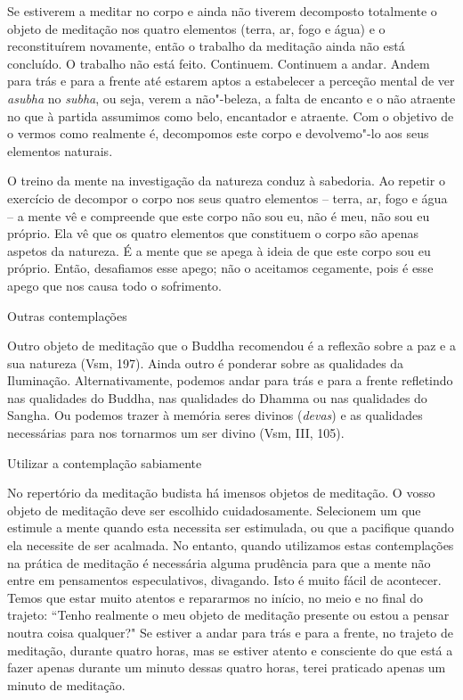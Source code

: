 Se estiverem a meditar no corpo e ainda não tiverem decomposto
totalmente o objeto de meditação nos quatro elementos (terra, ar, fogo e
água) e o reconstituírem novamente, então o trabalho da meditação ainda
não está concluído. O trabalho não está feito. Continuem. Continuem a
andar. Andem para trás e para a frente até estarem aptos a estabelecer a
perceção mental de ver \emph{asubha} no \emph{subha}, ou seja, verem a
não"-beleza, a falta de encanto e o não atraente no que à partida
assumimos como belo, encantador e atraente. Com o objetivo de o vermos
como realmente é, decompomos este corpo e devolvemo"-lo aos seus
elementos naturais.

O treino da mente na investigação da natureza conduz à sabedoria. Ao
repetir o exercício de decompor o corpo nos seus quatro elementos --
terra, ar, fogo e água -- a mente vê e compreende que este corpo não sou
eu, não é meu, não sou eu próprio. Ela vê que os quatro elementos que
constituem o corpo são apenas aspetos da natureza. É a mente que se
apega à ideia de que este corpo sou eu próprio. Então, desafiamos esse
apego; não o aceitamos cegamente, pois é esse apego que nos causa todo o
sofrimento.

\begin{siderule-quote}
  Outras contemplações
\end{siderule-quote}

Outro objeto de meditação que o Buddha recomendou é a reflexão
sobre a paz e a sua natureza (Vsm, 197). Ainda outro é ponderar sobre as
qualidades da Iluminação. Alternativamente, podemos andar para trás e
para a frente refletindo nas qualidades do Buddha, nas qualidades
do Dhamma ou nas qualidades do Sangha. Ou podemos trazer à
memória seres divinos (\emph{devas}) e as qualidades necessárias para
nos tornarmos um ser divino (Vsm, III, 105).

\begin{siderule-quote}
  Utilizar a contemplação sabiamente
\end{siderule-quote}

No repertório da meditação budista há imensos objetos de meditação. O
vosso objeto de meditação deve ser escolhido cuidadosamente. Selecionem
um que estimule a mente quando esta necessita ser estimulada, ou que a
pacifique quando ela necessite de ser acalmada. No entanto, quando
utilizamos estas contemplações na prática de meditação é necessária
alguma prudência para que a mente não entre em pensamentos
especulativos, divagando. Isto é muito fácil de acontecer. Temos que
estar muito atentos e repararmos no início, no meio e no final do
trajeto: ``Tenho realmente o meu objeto de meditação presente ou estou a
pensar noutra coisa qualquer?" Se estiver a andar para trás e para a
frente, no trajeto de meditação, durante quatro horas, mas se estiver
atento e consciente do que está a fazer apenas durante um minuto dessas
quatro horas, terei praticado apenas um minuto de meditação.

